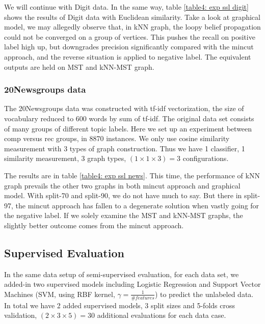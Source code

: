 We will continue with Digit data. In the same way, table \ref{table4: exp ssl digit} shows the results of Digit data with Euclidean similarity.  Take a look at graphical model, we may allegedly observe that, in kNN graph, the loopy belief propagation could not be converged on a group of vertices. This pushes the recall on positive label high up, but downgrades precision significantly compared with the mincut approach, and the reverse situation is applied to negative label. The equivalent outputs are held on MST and kNN-MST graph.

\subsubsection*{20Newsgroups data}
The 20Newsgroups data was constructed with tf-idf vectorization, the size of vocabulary reduced to 600 words by sum of tf-idf. The original data set consists of many groups of different topic labels. Here we set up an experiment between comp versus rec groups, in 8870 instances. We only use cosine similarity measurement with 3 types of graph construction. Thus we have 1 classifier, 1 similarity measurement, 3 graph types, $(1 \times 1 \times 3) = 3$ configurations.

The results are in table \ref{table4: exp ssl news}. This time, the performance of kNN graph prevails the other two graphs in both mincut approach and graphical model. With split-70 and split-90, we do not have much to say. But there in split-97, the mincut approach has fallen to a degenerate solution when vastly going for the negative label. If we solely examine the MST and kNN-MST graphs, the slightly better outcome comes from the mincut approach.  

\subsection{Supervised Evaluation}
\label{subsection: exp sl}

In the same data setup of semi-supervised evaluation, for each data set, we added-in two supervised models including Logistic Regression and Support Vector Machines (SVM, using RBF kernel, $\gamma=\frac{1}{\#features}$) to predict the unlabeled data. In total we have 2 added supervised models, 3 split sizes and 5-folds cross validation, $(2 \times 3 \times 5) = 30$ additional evaluations for each data case. 

